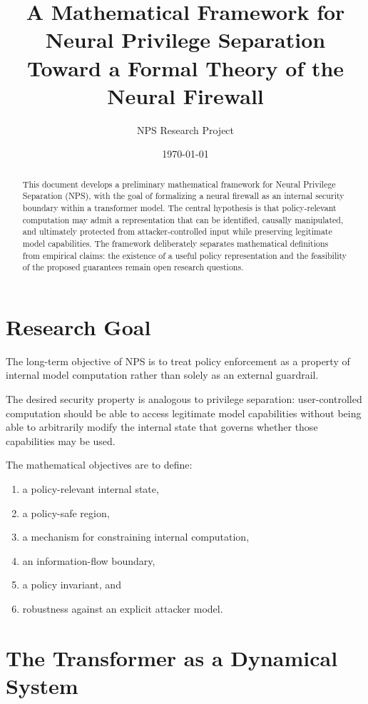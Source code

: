 \documentclass[11pt]{article}
\title{\textbf{A Mathematical Framework for Neural Privilege Separation}\\
\large Toward a Formal Theory of the Neural Firewall}
\author{NPS Research Project}
\date{\today}
\begin{document}
\maketitle

\begin{abstract}
This document develops a preliminary mathematical framework for Neural
Privilege Separation (NPS), with the goal of formalizing a neural firewall as
an internal security boundary within a transformer model. The central
hypothesis is that policy-relevant computation may admit a representation
that can be identified, causally manipulated, and ultimately protected from
attacker-controlled input while preserving legitimate model capabilities.
The framework deliberately separates mathematical definitions from empirical
claims: the existence of a useful policy representation and the feasibility
of the proposed guarantees remain open research questions.
\end{abstract}

\section{Research Goal}

The long-term objective of NPS is to treat policy enforcement as a property
of internal model computation rather than solely as an external guardrail.

The desired security property is analogous to privilege separation:
user-controlled computation should be able to access legitimate model
capabilities without being able to arbitrarily modify the internal state that
governs whether those capabilities may be used.

The mathematical objectives are to define:
\begin{enumerate}[label=\arabic*.]
\item a policy-relevant internal state,
\item a policy-safe region,
\item a mechanism for constraining internal computation,
\item an information-flow boundary,
\item a policy invariant, and
\item robustness against an explicit attacker model.
\end{enumerate}

\section{The Transformer as a Dynamical System}
\end{document}
